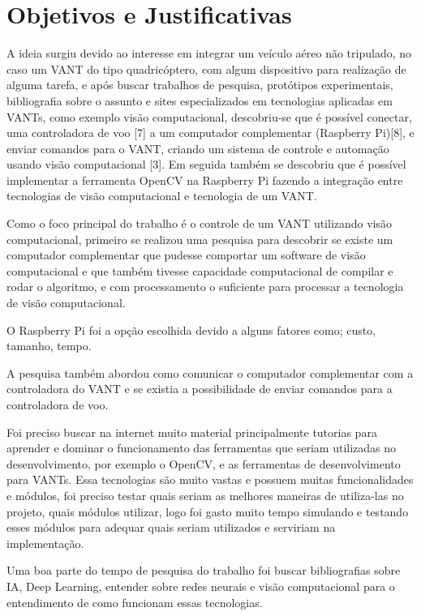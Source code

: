 \chapter{Objetivos e Justificativas}\label{cap:objJust}
A ideia surgiu devido ao interesse em integrar um veículo aéreo não tripulado, no caso um VANT do tipo quadricóptero, com algum dispositivo para realização de alguma tarefa, e após buscar trabalhos de pesquisa, protótipos experimentais, bibliografia sobre o assunto e sites especializados em tecnologias aplicadas em VANTs, como exemplo visão computacional, descobriu-se que é possível conectar, uma controladora de voo \cite{sete} [7] a um computador complementar (Raspberry Pi)\cite{oito}[8], e enviar comandos para o VANT, criando um sistema de controle e automação usando visão computacional \cite{tres}[3]. Em seguida também se descobriu que é possível implementar a ferramenta OpenCV na Raspberry Pi fazendo a integração entre tecnologias de visão computacional e tecnologia de um VANT.

Como o foco principal do trabalho é o controle de um VANT utilizando visão computacional, primeiro se realizou uma pesquisa para descobrir se existe um computador complementar que pudesse comportar um software de visão computacional e que também tivesse capacidade computacional de compilar e rodar o algoritmo, e com processamento o suficiente para processar a tecnologia de visão computacional.

O Raspberry Pi foi a opção escolhida devido a alguns fatores como; custo, tamanho, tempo.

A pesquisa também abordou como comunicar o computador complementar com a controladora do VANT e se existia a possibilidade de enviar comandos para a controladora de voo. 

Foi preciso buscar na internet muito material principalmente tutorias para aprender e dominar o funcionamento das ferramentas que seriam utilizadas no desenvolvimento, por exemplo o OpenCV, e as ferramentas de desenvolvimento para VANTs. Essa tecnologias são muito vastas e possuem muitas funcionalidades e módulos, foi preciso testar quais seriam as melhores maneiras de utiliza-las no projeto, quais módulos utilizar, logo foi gasto muito tempo simulando e testando esses módulos para adequar quais seriam utilizados e serviriam na implementação.  

Uma boa parte do tempo de pesquisa  do trabalho foi buscar bibliografias sobre IA, Deep Learning, entender sobre redes neurais e visão computacional para o entendimento de como funcionam essas tecnologias.

